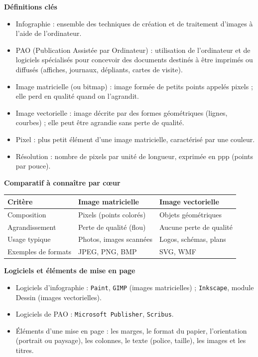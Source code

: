 \documentclass[11pt]{article}
\newcommand{\cle}[1]{{\popxbold\color{popdark}#1}}
\begin{document}
\begin{bilan}
\textbf{Définitions clés}
\begin{itemize}
  \item \cle{Infographie} : ensemble des techniques de création et de traitement d'images à l'aide de l'ordinateur.
  \item \cle{PAO} (Publication Assistée par Ordinateur) : utilisation de l'ordinateur et de logiciels spécialisés pour concevoir des documents destinés à être imprimés ou diffusés (affiches, journaux, dépliants, cartes de visite).
  \item \cle{Image matricielle} (ou bitmap) : image formée de petits points appelés \cle{pixels} ; elle perd en qualité quand on l'agrandit.
  \item \cle{Image vectorielle} : image décrite par des formes géométriques (lignes, courbes) ; elle peut être agrandie sans perte de qualité.
  \item \cle{Pixel} : plus petit élément d'une image matricielle, caractérisé par une couleur.
  \item \cle{Résolution} : nombre de pixels par unité de longueur, exprimée en ppp (points par pouce).
\end{itemize}

\textbf{Comparatif à connaître par c\oe ur}
\begin{center}
\begin{tabularx}{\linewidth}{|l|X|X|}
\hline
\rowcolor{popblueL} \textbf{Critère} & \textbf{Image matricielle} & \textbf{Image vectorielle} \\
\hline
Composition & Pixels (points colorés) & Objets géométriques \\
\hline
Agrandissement & Perte de qualité (flou) & Aucune perte de qualité \\
\hline
Usage typique & Photos, images scannées & Logos, schémas, plans \\
\hline
Exemples de formats & JPEG, PNG, BMP & SVG, WMF \\
\hline
\end{tabularx}
\end{center}

\textbf{Logiciels et éléments de mise en page}
\begin{itemize}
  \item Logiciels d'infographie : \texttt{Paint}, \texttt{GIMP} (images matricielles) ; \texttt{Inkscape}, module Dessin (images vectorielles).
  \item Logiciels de PAO : \texttt{Microsoft Publisher}, \texttt{Scribus}.
  \item Éléments d'une mise en page : les \cle{marges}, le \cle{format} du papier, l'\cle{orientation} (portrait ou paysage), les \cle{colonnes}, le \cle{texte} (police, taille), les \cle{images} et les \cle{titres}.
\end{itemize}


\end{bilan}
\end{document}
